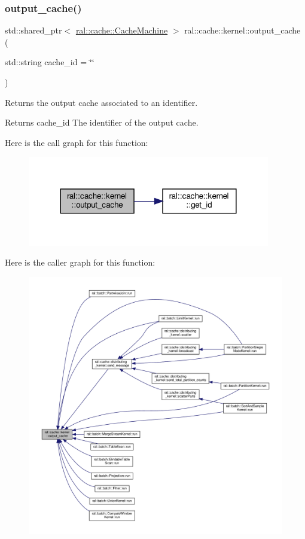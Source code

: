 \subsubsection{\texorpdfstring{output\+\_\+cache()}{output\_cache()}}
{\footnotesize\ttfamily std\+::shared\+\_\+ptr$<$ \hyperlink{classral_1_1cache_1_1CacheMachine}{ral\+::cache\+::\+Cache\+Machine} $>$ ral\+::cache\+::kernel\+::output\+\_\+cache (\begin{DoxyParamCaption}\item[{std\+::string}]{cache\+\_\+id = {\ttfamily \char`\"{}\char`\"{}} }\end{DoxyParamCaption})}



Returns the output cache associated to an identifier. 

\begin{DoxyReturn}{Returns}
cache\+\_\+id The identifier of the output cache. 
\end{DoxyReturn}
Here is the call graph for this function\+:\nopagebreak
\begin{figure}[H]
\begin{center}
\leavevmode
\includegraphics[width=300pt]{classral_1_1cache_1_1kernel_a94c3bd66b93a0e67165d0a54741c19dc_cgraph}
\end{center}
\end{figure}
Here is the caller graph for this function\+:\nopagebreak
\begin{figure}[H]
\begin{center}
\leavevmode
\includegraphics[width=350pt]{classral_1_1cache_1_1kernel_a94c3bd66b93a0e67165d0a54741c19dc_icgraph}
\end{center}
\end{figure}
